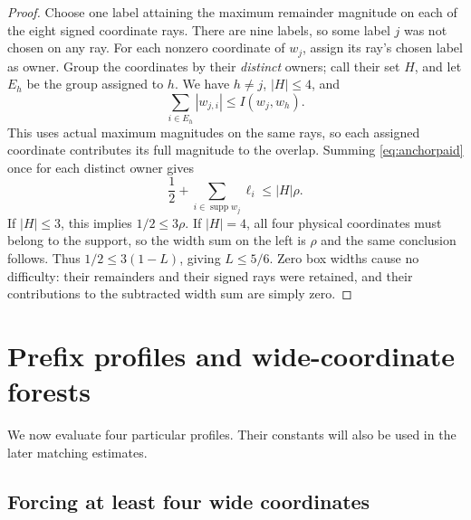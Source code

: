 \documentclass[11pt]{article}
\theoremstyle{definition}
\theoremstyle{remark}
\newcommand{\abs}[1]{\left|#1\right|}
\DeclareMathOperator{\supp}{supp}
\begin{document}
\begin{proof}
Choose one label attaining the maximum remainder magnitude on each of
the eight signed coordinate rays. There are nine labels, so some label
$j$ was not chosen on any ray. For each nonzero coordinate of $w_j$,
assign its ray's chosen label as owner. Group the coordinates by their
\emph{distinct} owners; call their set $H$, and let $E_h$ be the group
assigned to $h$. We have $h\ne j$, $\abs H\leq4$, and
\[
 \sum_{i\in E_h}\abs{w_{j,i}}\leq I(w_j,w_h).
\]
This uses actual maximum magnitudes on the same rays, so each assigned
coordinate contributes its full magnitude to the overlap. Summing
\eqref{eq:anchorpaid} once for each distinct owner gives
\begin{equation}\label{eq:ownercap}
 \frac12+\sum_{i\in\supp w_j}\ell_i\leq\abs H\rho.
\end{equation}
If $\abs H\leq3$, this implies $1/2\leq3\rho$. If $\abs H=4$,
all four physical coordinates must belong to the support, so the width
sum on the left is $\rho$ and the same conclusion follows. Thus
$1/2\leq3(1-L)$, giving $L\leq5/6$.
Zero box widths cause no difficulty: their remainders and their signed
rays were retained, and their contributions to the subtracted width sum
are simply zero.
\end{proof}

\section{Prefix profiles and wide-coordinate forests}\label{sec:forest}

We now evaluate four particular profiles. Their constants will also be
used in the later matching estimates.

\subsection{Forcing at least four wide coordinates}
\end{document}
